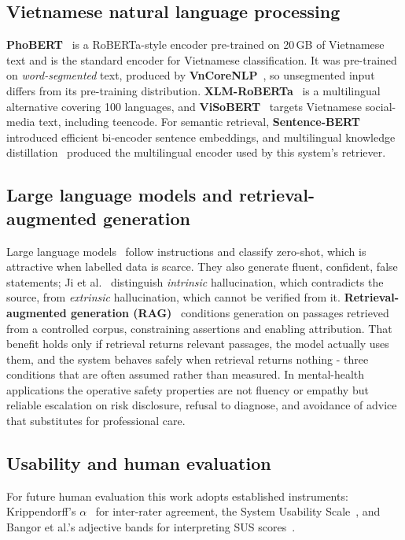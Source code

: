 \subsection{Vietnamese natural language processing}
\textbf{PhoBERT}~\cite{nguyen2020phobert} is a RoBERTa-style encoder pre-trained on 20\,GB of Vietnamese text and is the standard encoder for Vietnamese classification. It was pre-trained on \textit{word-segmented} text, produced by \textbf{VnCoreNLP}~\cite{vu2018vncorenlp}, so unsegmented input differs from its pre-training distribution. \textbf{XLM-RoBERTa}~\cite{conneau2020xlmr} is a multilingual alternative covering 100 languages, and \textbf{ViSoBERT}~\cite{nguyen2023visobert} targets Vietnamese social-media text, including teencode. For semantic retrieval, \textbf{Sentence-BERT}~\cite{reimers2019sbert} introduced efficient bi-encoder sentence embeddings, and multilingual knowledge distillation~\cite{reimers2020multilingual} produced the multilingual encoder used by this system's retriever.

\subsection{Large language models and retrieval-augmented generation}
Large language models~\cite{brown2020gpt3} follow instructions and classify zero-shot, which is attractive when labelled data is scarce. They also generate fluent, confident, false statements; Ji et al.~\cite{ji2023hallucination} distinguish \textit{intrinsic} hallucination, which contradicts the source, from \textit{extrinsic} hallucination, which cannot be verified from it. \textbf{Retrieval-augmented generation (RAG)}~\cite{lewis2020rag} conditions generation on passages retrieved from a controlled corpus, constraining assertions and enabling attribution. That benefit holds only if retrieval returns relevant passages, the model actually uses them, and the system behaves safely when retrieval returns nothing - three conditions that are often assumed rather than measured. In mental-health applications the operative safety properties are not fluency or empathy but reliable escalation on risk disclosure, refusal to diagnose, and avoidance of advice that substitutes for professional care.

\subsection{Usability and human evaluation}
For future human evaluation this work adopts established instruments: Krippendorff's $\alpha$~\cite{krippendorff2004} for inter-rater agreement, the System Usability Scale~\cite{brooke1996sus}, and Bangor et al.'s adjective bands for interpreting SUS scores~\cite{bangor2009sus}.

